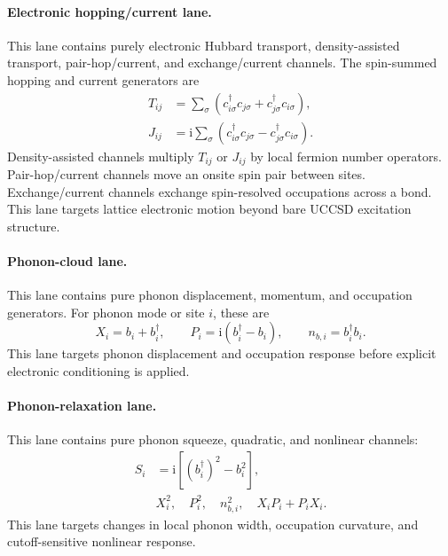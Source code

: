 \documentclass[
  reprint,
  amsmath,
  amssymb,
  aps,
  pra,
  nofootinbib,
  superscriptaddress,
  floatfix
]{revtex4-2}
\newcommand{\ii}{\mathrm{i}}
\begin{document}
\paragraph*{Electronic hopping/current lane.}
This lane contains purely electronic Hubbard transport, density-assisted
transport, pair-hop/current, and exchange/current channels. The spin-summed
hopping and current generators are
\begin{align*}
T_{ij}
&=
\sum_{\sigma}
(c_{i\sigma}^{\dagger}c_{j\sigma}
+c_{j\sigma}^{\dagger}c_{i\sigma}),\\
J_{ij}
&=
\ii\sum_{\sigma}
(c_{i\sigma}^{\dagger}c_{j\sigma}
-c_{j\sigma}^{\dagger}c_{i\sigma}) .
\end{align*}
Density-assisted channels multiply \(T_{ij}\) or \(J_{ij}\) by local fermion
number operators. Pair-hop/current channels move an onsite spin pair between
sites. Exchange/current channels exchange spin-resolved occupations across a
bond. This lane targets lattice electronic motion beyond bare UCCSD excitation
structure.

\paragraph*{Phonon-cloud lane.}
This lane contains pure phonon displacement, momentum, and occupation generators. For phonon mode or site \(i\), these are
\[
X_i=b_i+b_i^\dagger,
\qquad
P_i=\ii(b_i^\dagger-b_i),
\qquad
n_{b,i}=b_i^\dagger b_i .
\]
This lane targets phonon displacement and occupation response before explicit electronic conditioning is applied.

\paragraph*{Phonon-relaxation lane.}
This lane contains pure phonon squeeze, quadratic, and nonlinear
channels:
\begin{align*}
S_i&=\ii[(b_i^\dagger)^2-b_i^2],\\
&X_i^2,\quad P_i^2,\quad n_{b,i}^2,\quad
X_iP_i+P_iX_i .
\end{align*}
This lane targets changes in local phonon width, occupation curvature, and
cutoff-sensitive nonlinear response.
\end{document}
